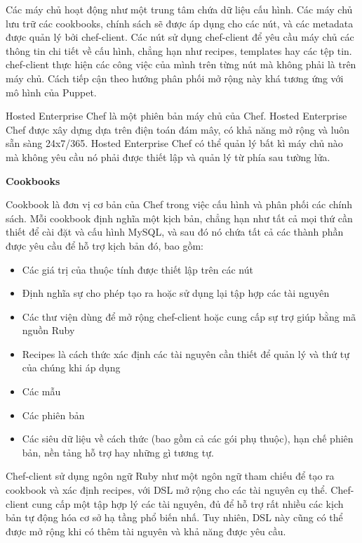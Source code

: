 Các máy chủ hoạt động như một trung tâm chứa dữ liệu cấu hình. Các máy chủ lưu trữ các cookbooks, chính sách sẽ được áp dụng cho các nút, và các metadata được quản lý bởi chef-client. Các nút sử dụng chef-client để yêu cầu máy chủ các thông tin chi tiết về cấu hình, chẳng hạn như recipes, templates hay các tệp tin. chef-client thực hiện các công việc của mình trên từng nút mà không phải là trên máy chủ. Cách tiếp cận theo hướng phân phối mở rộng này khá tương ứng với mô hình của Puppet.

Hosted Enterprise Chef là một phiên bản máy chủ của Chef. Hosted Enterprise Chef được xây dựng dựa trên điện toán đám mây, có khả năng mở rộng và luôn sẵn sàng 24x7/365. Hosted Enterprise Chef có thể quản lý bất kì máy chủ nào mà không yêu cầu nó phải được thiết lập và quản lý từ phía sau tường lửa.

\textbf{\large Cookbooks}


Cookbook là đơn vị cơ bản của Chef trong việc cấu hình và phân phối các chính sách. Mỗi cookbook định nghĩa một kịch bản, chẳng hạn như tất cả mọi thứ cần thiết để cài đặt và cấu hình MySQL, và sau đó nó chứa tất cả các thành phần được yêu cầu để hỗ trợ kịch bản đó, bao gồm:

\begin{itemize}
\item Các giá trị của thuộc tính được thiết lập trên các nút
\item Định nghĩa sự cho phép tạo ra hoặc sử dụng lại tập hợp các tài nguyên
\item Các thư viện dùng để mở rộng chef-client hoặc cung cấp sự trợ giúp bằng mã nguồn Ruby
\item Recipes là cách thức xác định các tài nguyên cần thiết để quản lý và thứ tự của chúng khi áp dụng
\item Các mẫu
\item Các phiên bản
\item Các siêu dữ liệu về cách thức (bao gồm cả các gói phụ thuộc), hạn chế phiên bản, nền tảng hỗ trợ hay những gì tương tự.
\end{itemize}

Chef-client sử dụng ngôn ngữ Ruby như một ngôn ngữ tham chiếu để tạo ra cookbook và xác định recipes, với DSL mở rộng cho các tài nguyên cụ thể. Chef-client cung cấp một tập hợp lý các tài nguyên, đủ để hỗ trợ rất nhiều các kịch bản tự động hóa cơ sở hạ tầng phổ biến nhấ. Tuy nhiên, DSL này cũng có thể được mở rộng khi có thêm tài nguyên và khả năng được yêu cầu.

